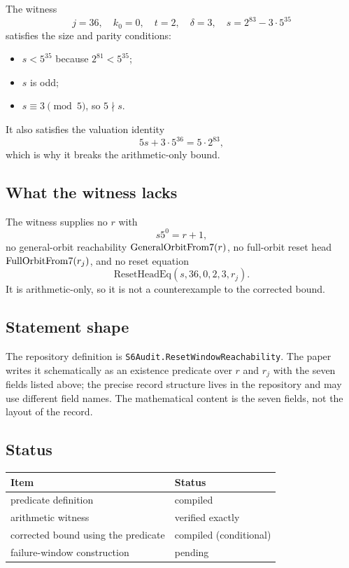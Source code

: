 The witness
\begin{equation*}
  j=36,\quad k_0=0,\quad t=2,\quad \delta=3,\quad
  s=2^{83}-3\cdot5^{35}
\end{equation*}
satisfies the size and parity conditions:
\begin{itemize}[leftmargin=*]
\item $s<5^{35}$ because $2^{81}<5^{35}$;
\item $s$ is odd;
\item $s\equiv3\pmod5$, so $5\nmid s$.
\end{itemize}
It also satisfies the valuation identity
\begin{equation*}
  5s+3\cdot5^{36}=5\cdot2^{83},
\end{equation*}
which is why it breaks the arithmetic-only bound.

\subsection{What the witness lacks}

The witness supplies no $r$ with
\begin{equation*}
  s5^{0}=r+1,
\end{equation*}
no general-orbit reachability $\mathrm{GeneralOrbitFrom7}(r)$, no full-orbit reset
head $\mathrm{FullOrbitFrom7}(r_j)$, and no reset equation
\begin{equation*}
  \mathrm{ResetHeadEq}(s,36,0,2,3,r_j).
\end{equation*}
It is arithmetic-only, so it is not a counterexample to the corrected
bound.

\subsection{Statement shape}

The repository definition is
\texttt{S6Audit.ResetWindowReachability}.  The paper writes it
schematically as an existence predicate over $r$ and $r_j$ with the
seven fields listed above; the precise record structure lives in the
repository and may use different field names.  The mathematical
content is the seven fields, not the layout of the record.

\subsection{Status}

\begin{center}
\small
\begin{tabular}{@{}p{}p{}@{}}
\toprule
Item & Status \\
\midrule
predicate definition & compiled \\
arithmetic witness & verified exactly \\
corrected bound using the predicate & compiled (conditional) \\
failure-window construction & pending \\
\bottomrule
\end{tabular}
\end{center}
